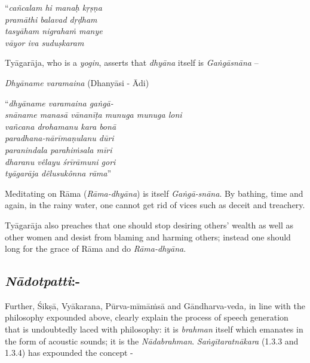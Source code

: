 \begin{centerquote}
“\textit{cañcalam hi manaḥ kṛṣṇa}\\ \textit{pramāthi balavad dṛḍham }\\ \textit{tasyāham nigrahaṁ manye}\\ \textit{vāyor iva suduṣkaram} 
\end{centerquote}

Tyāgarāja, who is a \textit{yogin}, asserts that \textit{dhyāna} itself is \textit{Gaṅgāsnāna} –

\textit{Dhyāname varamaina} (Dhanyāsi - Ādi)

\begin{centerquote}
“\textit{dhyāname varamaina gaṅgā-}\\ \textit{snāname manasā vānanīṭa munuga munuga loni} \\ \textit{vañcana drohamanu kara bonā}\\ \textit{paradhana-nārīmaṇulanu dūri}\\ \textit{paranindala parahiṁsala mīri}\\ \textit{dharanu vêlayu śrīrāmuni gori}\\ \textit{tyāgarāja dêlusukônna rāma}”
\end{centerquote}

Meditating on Rāma (\textit{Rāma-dhyāna}) is itself \textit{Gaṅgā-snāna}. By bathing, time and again, in the rainy water, one cannot get rid of vices such as deceit and treachery. 

Tyāgarāja also preaches that one should stop desiring others’ wealth as well as other women and desist from blaming and harming others; instead one should long for the grace of Rāma and do \textit{Rāma-dhyāna}.

\vspace{-.3cm}

\subsection*{\textit{Nādotpatti}:-}

Further, Śikṣā, Vyākarana, Pūrva-mīmāṁsā and Gāndharva-veda\textit{,} in line with the philosophy expounded above, clearly explain the process of speech generation that is undoubtedly laced with philosophy: it is \textit{brahman} itself which emanates in the form of acoustic sounds; it is the \textit{Nādabrahman}. \textit{Saṅgītaratnākara} (1.3.3 and 1.3.4) has expounded the concept -

